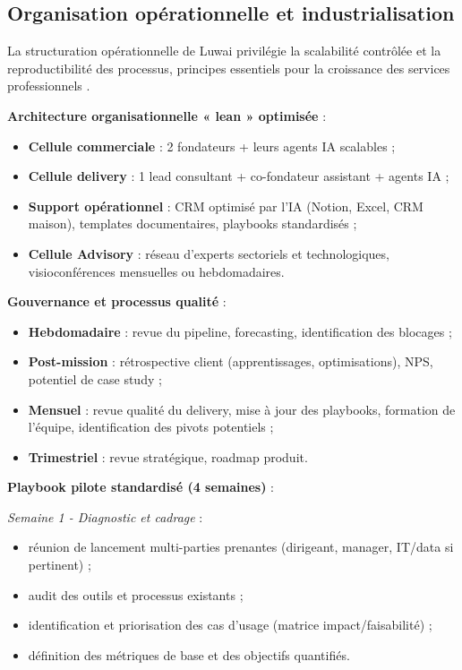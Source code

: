 \subsection{Organisation opérationnelle et industrialisation}

La structuration opérationnelle de Luwai privilégie la scalabilité contrôlée et la reproductibilité des processus, principes essentiels pour la croissance des services professionnels \cite{maister2012managing}.

\textbf{Architecture organisationnelle « lean » optimisée} :
\begin{itemize}
    \item \textbf{Cellule commerciale} : 2 fondateurs + leurs agents IA scalables ;
    \item \textbf{Cellule delivery} : 1 lead consultant + co-fondateur assistant + agents IA ;
    \item \textbf{Support opérationnel} : CRM optimisé par l'IA (Notion, Excel, CRM maison), templates documentaires, playbooks standardisés ;
    \item \textbf{Cellule Advisory} : réseau d’experts sectoriels et technologiques, visioconférences mensuelles ou hebdomadaires.
\end{itemize}

\textbf{Gouvernance et processus qualité} :
\begin{itemize}
    \item \textbf{Hebdomadaire} : revue du pipeline, forecasting, identification des blocages ;
    \item \textbf{Post-mission} : rétrospective client (apprentissages, optimisations), NPS, potentiel de case study ;
    \item \textbf{Mensuel} : revue qualité du delivery, mise à jour des playbooks, formation de l'équipe, identification des pivots potentiels ;
    \item \textbf{Trimestriel} : revue stratégique, roadmap produit.
\end{itemize}

\textbf{Playbook pilote standardisé (4 semaines)} :

\textit{Semaine 1 - Diagnostic et cadrage} :
\begin{itemize}
    \item réunion de lancement multi-parties prenantes (dirigeant, manager, IT/data si pertinent) ;
    \item audit des outils et processus existants ;
    \item identification et priorisation des cas d'usage (matrice impact/faisabilité) ;
    \item définition des métriques de base et des objectifs quantifiés.
\end{itemize}

